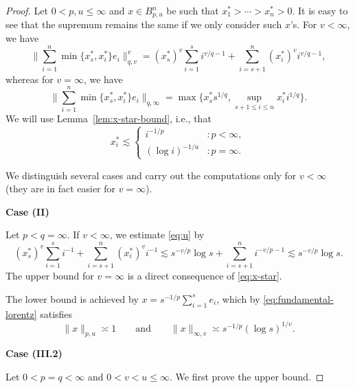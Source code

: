 \documentclass[a4paper,12pt]{article}
\theoremstyle{definition}
\begin{document}
\begin{proof}
Let $0<p,u\le \infty$ and $x\in B_{p,u}^n$ be such that $x_1^*>\cdots>x_n^*>0$. It is easy to see that the supremum remains the same if we only consider such $x$'s. For $v<\infty$, we have 
\begin{equation}\label{eq:u}
\Big\| \sum_{i=1}^{n}\min\{x_s^*,x_i^*\}e_i\Big\|_{q,v}^v
=(x_s^*)^v\sum_{i=1}^{s}i^{v/q-1} +\sum_{i=s+1}^{n}(x_i^*)^v i^{v/q-1},
\end{equation}
whereas for $v=\infty$, we have
\[
\Big\| \sum_{i=1}^{n}\min\{x_s^*,x_i^*\}e_i\Big\|_{q,\infty}
=\max\{x_s^* s^{1/q}, \sup_{s+1\le i\le n}x_i^* i^{1/q}\}.
\]
We will use Lemma~\ref{lem:x-star-bound}, i.e., that
\begin{equation} \label{eq:x-star}
x_i^*\lesssim 
\begin{cases}
i^{-1/p}&\colon p<\infty,\\
(\log i)^{-1/u}&\colon p=\infty.
\end{cases}
\end{equation}

We distinguish several cases and carry out the computations only for $v<\infty$ (they are in fact easier for $v=\infty$).

\noindent \textbf{Case (II)} 

Let $p<q=\infty$. If $v<\infty$, we estimate \eqref{eq:u} by
\[
(x_s^*)^v\sum_{i=1}^{s}i^{-1} +\sum_{i=s+1}^{n}(x_i^*)^v i^{-1}
\lesssim s^{-v/p}\log s +\sum_{i=s+1}^{n}i^{-v/p-1}
\lesssim s^{-v/p}\log s.
\]
The upper bound for $v=\infty$ is a direct consequence of \eqref{eq:x-star}.

The lower bound is achieved by $x=s^{-1/p}\sum_{i=1}^{s}e_i$, which by \eqref{eq:fundamental-lorentz} satisfies
\[
\|x\|_{p,u}\asymp 1 \qquad \text{and}\qquad \|x\|_{\infty,v}\asymp s^{-1/p}(\log s)^{1/v}.
\]

\noindent \textbf{Case (III.2)} 

Let $0<p=q<\infty$ and $0<v<u\le \infty$. We first prove the upper bound.


\end{proof}
\end{document}
